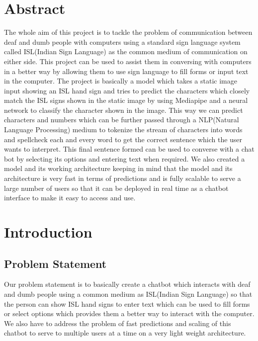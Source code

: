 \documentclass[12pt,a4paper]{report}
\begin{document}
\renewcommand\bibname{References}

\chapter*{Abstract}
The whole aim of this project is to tackle the problem of communication between deaf and dumb people with computers using a standard sign language system called ISL(Indian Sign Language) as the common medium of communication on either side. This project can be used to assist them in conversing with computers in a better way by allowing them to use sign language to fill forms or input text in the computer. The project is basically a model which takes a static image input showing an ISL hand sign and tries to predict the characters which closely match the ISL signs shown in the static image by using Mediapipe and a neural network to classify the character shown in the image. This way we can predict characters and numbers which can be further passed through a NLP(Natural Language Processing) medium to tokenize the stream of characters into words and spellcheck each and every word to get the correct sentence which the user wants to interpret. This final sentence formed can be used to converse with a chat bot by selecting its options and entering text when required. We also created a model and its working architecture keeping in mind that the model and its architecture is very fast in terms of predictions and is fully scalable to serve a large number of users so that it can be deployed in real time as a chatbot interface to make it easy to access and use.

\tableofcontents
\listoffigures
\listoftables

\chapter{Introduction}

\section{Problem Statement}
Our problem statement is to basically create a chatbot which interacts with deaf and dumb people using a common medium as ISL(Indian Sign Language) so that the person can show ISL hand signs to enter text which can be used to fill forms or select options which provides them a better way to interact with the computer. We also have to address the problem of fast predictions and scaling of this chatbot to serve to multiple users at a time on a very light weight architecture.
\end{document}
